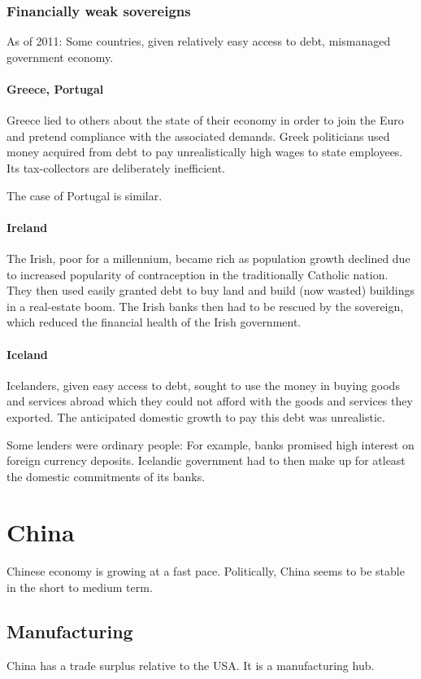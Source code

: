 \documentclass[oneside, article]{memoir}
\begin{document}
\subsection{Financially weak sovereigns}
As of 2011: Some countries, given relatively easy access to debt, mismanaged government economy.

\subsubsection{Greece, Portugal}
Greece lied to others about the state of their economy in order to join the Euro and pretend compliance with the associated demands. Greek politicians used money acquired from debt to pay unrealistically high wages to state employees. Its tax-collectors are deliberately inefficient.

The case of Portugal is similar.

\subsubsection{Ireland}
The Irish, poor for a millennium, became rich as population growth declined due to increased popularity of contraception in the traditionally Catholic nation. They then used easily granted debt to buy land and build (now wasted) buildings in a real-estate boom. The Irish banks then had to be rescued by the sovereign, which reduced the financial health of the Irish government.

\subsubsection{Iceland}
Icelanders, given easy access to debt, sought to use the money in buying goods and services abroad which they could not afford with the goods and services they exported. The anticipated domestic growth to pay this debt was unrealistic.

Some lenders were ordinary people: For example, banks promised high interest on foreign currency deposits. Icelandic government had to then make up for atleast the domestic commitments of its banks.

\chapter{China}
Chinese economy is growing at a fast pace. Politically, China seems to be stable in the short to medium term.

\section{Manufacturing}
China has a trade surplus relative to the USA. It is a manufacturing hub.
\end{document}
